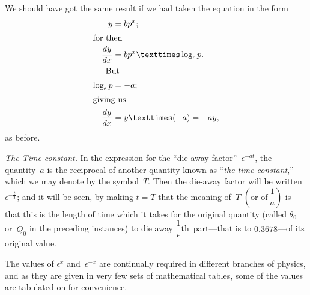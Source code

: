 \documentclass[12pt]{book}[2005/09/16]
\newcommand{\Paragraph}[1]{\medskip\pagebreak[1]\par\textit{#1}}
\newcommand{\DPPageSep}[2]{\Pagelabel{#2}}
\newcommand{\Pagelabel}[1]
  {\phantomsection\label{#1}}
\newcommand{\Pageref}[2][p.]{%
  \ifthenelse{\not\equal{#1}{}}{%
    \hyperref[#2]{#1~\pageref{#2}}%
  }{%
    \hyperref[#2]{\pageref{#2}}%
  }%
}
\newcommand{\DPchg}[2]{#2}%
\newcommand{\efrac}[2]{\frac{#1}{#2}}
\begin{document}
We should have got the same result if we had
taken the equation in the form
\begin{align*}
y &= bp^x; \\
\intertext{for then}
\frac{dy}{dx}
  &= bp^x × \log_\epsilon p. \\
\intertext{\indent But}
\log_\epsilon p &= -a; \\
\intertext{giving us}
\frac{dy}{dx} &= y × (-a) = -ay,
\end{align*}
as before.

\Paragraph{The Time-constant.} In the expression for the ``die-away
factor''~$\epsilon^{-at}$, the quantity~$a$ is the reciprocal of
another quantity known as ``\emph{the time-constant},'' which
we may denote by the symbol~$T$. Then the die-away
factor will be written~$\epsilon^{-\efrac{t}{T}}$; and it will be seen, by
making $t = T$ that the meaning of~$T$ $\left(\text{or of}~\dfrac{1}{a}\right)$ is that
this is the length of time which it takes for the original
quantity (called $\theta_0$ or~$Q_0$ in the preceding instances)
to die away $\dfrac{1}{\epsilon}$th~part---that is to $0.3678$---of its
original value.
\DPPageSep{171.png}{159}%

The values of $\epsilon^x$ and~$\epsilon^{-x}$ are continually required
in different branches of physics, and as they are given
in very few sets of mathematical tables, some of the
values are tabulated \DPchg{here}{on \Pageref{littletable}} for convenience.
\end{document}
